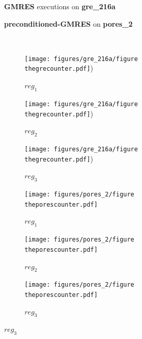 \documentclass[twoside]{article}
\newcounter{fig}\setcounter{fig}{0}
\begin{document}
  \begin{figure}[H]
    \centering
    
    \begin{minipage}[b]{0.45\linewidth}
      \centering
      \textbf{GMRES} executions on \textbf{gre_216a} 
    \end{minipage}
    \quad
    \begin{minipage}{0.45\linewidth}
      \centering
      \textbf{preconditioned-GMRES} on \textbf{pores_2}
    \end{minipage}\\


    \begin{minipage}[b]{0.48\linewidth}
      \begin{subfigure}[t]{\linewidth}
        \centering
        \texttt{[image: figures/gre\_216a/figure\\thegrecounter.pdf]})
        \caption{$reg_1$}\label{fig:gre_216a_conv_hist_register_0}		
      \end{subfigure}
      \quad
      \begin{subfigure}[t]{\linewidth}
        \centering
        \texttt{[image: figures/gre\_216a/figure\\thegrecounter.pdf]})
        \caption{$reg_2$}\label{fig:gre_216a_conv_hist_register_1}
      \end{subfigure}
      \quad
      \begin{subfigure}[t]{\linewidth}
        \centering
        \texttt{[image: figures/gre\_216a/figure\\thegrecounter.pdf]})
        \caption{$reg_3$}\label{fig:gre_216a_conv_hist_register_2}
      \end{subfigure}
    \end{minipage}
    \quad
    \begin{minipage}[b]{0.48\linewidth}
      \begin{subfigure}[t]{\linewidth}
        \centering
        \texttt{[image: figures/pores\_2/figure\\theporescounter.pdf]}
        \caption{$reg_1$}\label{fig:pores_2_conv_hist_register_0}		
      \end{subfigure}
      \quad
      \begin{subfigure}[t]{\linewidth}
        \centering
        \texttt{[image: figures/pores\_2/figure\\theporescounter.pdf]}
        \caption{$reg_2$}\label{fig:pores_2_conv_hist_register_1}
      \end{subfigure}
      \quad
      \begin{subfigure}[t]{\linewidth}
        \centering
        \texttt{[image: figures/pores\_2/figure\\theporescounter.pdf]}
        \caption{$reg_3$}\label{fig:pores_2_conv_hist_register_2}
      \end{subfigure}


\end{minipage}
\end{figure}
\end{document}
